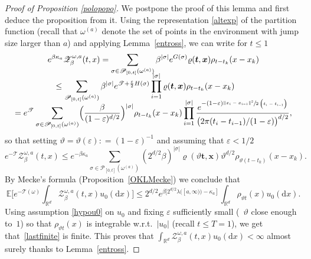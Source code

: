 \documentclass[10pt]{amsart}
\let\mathcal\mathscr
\theoremstyle{definition}
\newcommand{\bt}{\boldsymbol{t}}
\newcommand{\bx}{\boldsymbol{x}}
\newcommand{\dd}{\mathrm{d}}
\newcommand{\cP}{{\ensuremath{\mathcal P}} }
\newcommand{\cT}{{\ensuremath{\mathcal T}} }
\newcommand{\cZ}{{\ensuremath{\mathcal Z}} }
\newcommand{\bbE}{{\ensuremath{\mathbb E}} }
\newcommand{\bbR}{{\ensuremath{\mathbb R}} }
\let\gb\beta
\let\gep\varepsilon
\let\gl\lambda
\let\go\omega
\begin{document}
\begin{proof}[Proof of Proposition \ref{polopopo}]
We postpone the proof of this lemma and first deduce the proposition from it.
Using the representation \eqref{altexp} of the partition function (recall that $\go^{(a)}$ denote the set of points in the environment with jump size larger than $a$)
and applying Lemma~\ref{entross},
we can write for $t\le 1$
\begin{multline*}
e^{\beta \kappa_a}\cZ^{\go,a}_{\beta}(t,x)=\sum_{\sigma\in \cP_{[0,t]}(\go^{(a)})}\beta^{|\sigma|} e^{G(\sigma)} \varrho(\bt,\bx)\rho_{t-t_k}(x-x_k)\\[-8pt]
\hspace*{-7mm}\le \sum_{\cP_{[0,t]}(\go^{(a)})}\beta^{|\sigma|} e^{\cT+ \frac \gep 2 H(\sigma)} \prod_{i=1}^{|\sigma|} \varrho(\bt,\bx)\rho_{t-t_k}(x-x_k)\\[-8pt]
= e^{\cT} \sum_{\sigma\in \cP_{[0,t]}(\go^{(a)})} \Bigl(\frac{\beta}{(1-\gep)^{d/2}} \Bigr)^{|\sigma|} \rho_{t-t_k}(x-x_k) \prod_{i=1}^{ |\sigma|} \frac{e^{- (1-\gep)\sfrac{\|x_i-x_{i-1} \|^2}{2\left(t_i-t_{i-1}\right)}}}{ \bigl(2\pi (t_i-t_{i-1}) /(1-\gep)\bigr)^{d/2}},
\end{multline*}
so that setting $\vartheta =\vartheta(\gep): = (1-\gep)^{-1}$ and assuming that $\gep<1/2$
\begin{equation}
e^{-\cT} \cZ^{\go,a}_{\beta}(t,x) \leq e^{ -\gb \kappa_a} \sum_{\sigma\in \cP_{[0,t]}(\go^{(a)})}(2^{d/2}\beta)^{|\sigma|} \varrho(\vartheta \bt,\bx) \vartheta^{d/2} \rho_{ \vartheta (t-t_k)}(x-x_k).
\end{equation}
By Mecke's formula (Proposition~\ref{OKLMecke}) we conclude
that
\begin{equation}
\label{lastfinite}
\bbE\biggl[e^{-\cT(\go)}\int_{\bbR^d} \cZ^{\go, a}_{\beta}(t,x) u_0(\dd x)\biggr]\le 2^{d/2} e^{\beta [ 2^{d/2} \gl([a,\infty))-\kappa_a ]}\int_{\bbR^d } \rho_{ \vartheta t}(x) u_0(\dd x).
\end{equation}
Using assumption \eqref{hypou0} on $u_0$ and
fixing $\gep$ sufficiently small (\ie \ $\vartheta$ close enough to~$1$) so that $\rho_{ \vartheta t}(x)$
is integrable w.r.t.\ $|u_0|$ (recall $t\leq T =1$),
we get that~\eqref{lastfinite} is finite.
This proves that $\int_{\bbR^d} \cZ^{\go,a}_{\beta}(t,x)u_0(\dd x)<\infty$ almost surely thanks to Lemma~\ref{entross}.
\end{proof}
\end{document}
